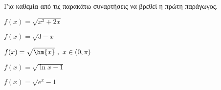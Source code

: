 Για καθεμία από τις παρακάτω συναρτήσεις να βρεθεί η πρώτη παράγωγος.
\begin{multicols}{2}
\begin{alist}
\item $ f(x)=\sqrt{x^2+2x} $
\item $ f(x)=\sqrt{3-x} $
\item $ f(x)=\sqrt{\hm{x}}\ ,\ x\in(0,\pi) $
\item $ f(x)=\sqrt{\ln{x}-1} $
\item $ f(x)=\sqrt{e^x-1} $
\end{alist}
\end{multicols}
